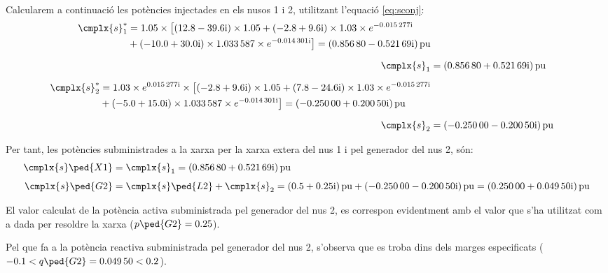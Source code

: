 \begin{exemple}
    Calcularem a continuació les potències injectades en els nusos 1 i
    2, utilitzant l'equació \eqref{eq:sconj}:
    \begin{align*}
    \begin{split}
    \cmplx{s}_1^* &= \num{1,05} \times\bigl[ (\complexnum{12,8-j39,6}) \times \num{1,05}
    +
    (\complexnum{-2,8+j9,6}) \times \num{1,03}\times e^{\complexnum{-j0,015277}}  \\
    &+ (\complexnum{-10,0+j30,0}) \times \num{1,033587}\times e^{ \complexnum{-j0,014301}}
    \bigr] = \complexqty{0,85680 - j 0,52169}{pu}
    \end{split} \\[1.5ex]
    \cmplx{s}_1 &= \complexqty{0,85680 + j 0,52169}{pu} \\[1.5ex]
    \begin{split}
    \cmplx{s}_2^* &= \num{1,03} \times e^{\complexnum{j0,015277}} \times\bigl[
    (\complexnum{-2,8+j9,6}) \times \num{1,05} +
     (\complexnum{7,8-j24,6}) \times \num{1,03}\times e^{\complexnum{-j0,015277}} \\
    & + (\complexnum{-5,0+j15,0}) \times \num{1,033587}\times e^{\complexnum{-j0,014301}}
    \bigr] = \complexqty{-0,25000 + j 0,20050}{pu}
    \end{split} \\[1.5ex]
     \cmplx{s}_2 &= \complexqty{-0,25000 - j 0,20050}{pu}
    \end{align*}

    Per tant, les potències subministrades a la xarxa per la xarxa extera del nus 1 i pel generador
    del nus 2, són:
    \begin{align*}
    \cmplx{s}\ped{X1} &= \cmplx{s}_1 = \complexqty{0,85680 + j 0,52169}{pu} \\[1ex]
    \cmplx{s}\ped{G2} &= \cmplx{s}\ped{L2} + \cmplx{s}_2 = \complexqty{0,5 + j0,25}{pu} +
    \complexqty{-0,25000 - j 0,20050}{pu}  = \complexqty{0,25000 + j 0,04950}{pu}
    \end{align*}

    El valor calculat de la potència activa subministrada pel generador
    del nus 2, es
     correspon evidentment amb el valor que s'ha utilitzat com a dada per
    resoldre la xarxa ($p\ped{G2}=\num{0,25}$).

    Pel que fa a la potència reactiva subministrada pel generador del
    nus 2, s'observa que es troba dins dels  marges especificats
    ($\num{-0,1}< q\ped{G2}=\num{0,04950} <\num{0,2}$).
\end{exemple}

